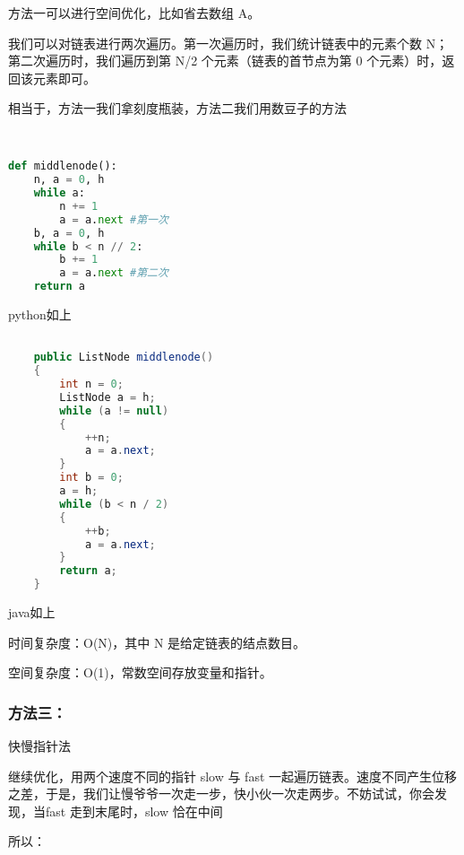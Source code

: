 方法一可以进行空间优化，比如省去数组 A。

我们可以对链表进行两次遍历。第一次遍历时，我们统计链表中的元素个数 N；第二次遍历时，我们遍历到第 N/2 个元素（链表的首节点为第 0 个元素）时，返回该元素即可。

相当于，方法一我们拿刻度瓶装，方法二我们用数豆子的方法
\begin{lstlisting}[language=python]


def middlenode():
    n, a = 0, h
    while a:
        n += 1
        a = a.next #第一次
    b, a = 0, h
    while b < n // 2:
        b += 1
        a = a.next #第二次
    return a

\end{lstlisting}
python如上
\begin{lstlisting}[language=java]

    public ListNode middlenode() 
    {
        int n = 0;
        ListNode a = h;
        while (a != null) 
        {
            ++n;
            a = a.next;
        }
        int b = 0;
        a = h;
        while (b < n / 2) 
        {
            ++b;
            a = a.next;
        }
        return a;
    }

\end{lstlisting}
java如上

时间复杂度：O(N)，其中 N 是给定链表的结点数目。

空间复杂度：O(1)，常数空间存放变量和指针。

\subsubsection{方法三：}
快慢指针法

继续优化，用两个速度不同的指针 slow 与 fast 一起遍历链表。速度不同产生位移之差，于是，我们让慢爷爷一次走一步，快小伙一次走两步。不妨试试，你会发现，当fast 走到末尾时，slow 恰在中间

所以：


